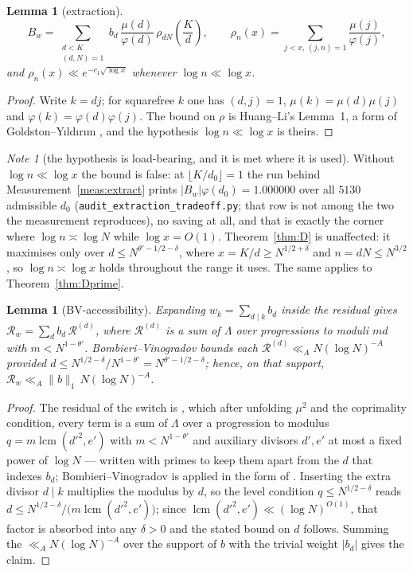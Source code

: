 \documentclass[11pt,a4paper]{article}
\theoremstyle{plain}
\newtheorem{lemma}[theorem]{Lemma}
\theoremstyle{definition}
\theoremstyle{remark}
\newtheorem{note}[theorem]{Note}
\DeclareMathOperator{\lcm}{lcm}
\begin{document}
\begin{lemma}[extraction]\label{lem:extract}
\[
  B_w=\sum_{\substack{d<K\\(d,N)=1}}b_d\,
   \frac{\mu(d)}{\varphi(d)}\,\rho_{dN}\!\left(\frac{K}{d}\right),
  \qquad
  \rho_{n}(x)=\!\!\sum_{j<x,\,(j,n)=1}\!\!\frac{\mu(j)}{\varphi(j)},
\]
and $\rho_n(x)\ll e^{-c_1\sqrt{\log x}}$ whenever $\log n\ll\log x$.
\end{lemma}

\begin{proof}
Write $k=dj$; for squarefree $k$ one has $(d,j)=1$,
$\mu(k)=\mu(d)\mu(j)$ and $\varphi(k)=\varphi(d)\varphi(j)$. The bound
on $\rho$ is Huang--Li's Lemma~1, a form of
Goldston--Y{\i}ld{\i}r{\i}m \cite{GY}, and the hypothesis
$\log n\ll\log x$ is theirs.
\end{proof}

\begin{note}[the hypothesis is load-bearing, and it is met where it is used]
Without $\log n\ll\log x$ the bound is false: at $\lfloor K/d_0\rfloor=1$
the run behind Measurement~\ref{meas:extract} prints
$|B_w|\varphi(d_0)=1.000000$ over all $5130$ admissible $d_0$
(\texttt{audit\_extraction\_tradeoff.py}; that row is not among the
two the measurement reproduces), no
saving at all, and that is exactly the corner where $\log n\asymp\log N$
while $\log x=O(1)$. Theorem~\ref{thm:D} is unaffected: it maximises
only over $d\le N^{\theta'-1/2-\delta}$, where $x=K/d\ge N^{1/2+\delta}$
and $n=dN\le N^{3/2}$, so $\log n\asymp\log x$ holds throughout the
range it uses. The same applies to Theorem~\ref{thm:Dprime}.
\end{note}

\begin{lemma}[BV-accessibility]\label{lem:bv}
Expanding $w_k=\sum_{d\mid k}b_d$ inside the residual gives
$\mathcal R_w=\sum_db_d\,\mathcal R^{(d)}$, where $\mathcal R^{(d)}$
is a sum of $\Lambda$ over progressions to moduli $md$ with
$m<N^{1-\theta'}$. Bombieri--Vinogradov bounds each
$\mathcal R^{(d)}\ll_AN(\log N)^{-A}$ provided
$d\le N^{1/2-\delta}/N^{1-\theta'}=N^{\theta'-1/2-\delta}$; hence, on
that support, $\mathcal R_w\ll_A\|b\|_1\,N(\log N)^{-A}$.
\end{lemma}

\begin{proof}
The residual of the switch is \cite[the residual identity]{P1}, which after unfolding
$\mu^2$ and the coprimality condition, every term is a sum of
$\Lambda$ over a progression to modulus $q=m\lcm(d'^2,e')$ with
$m<N^{1-\theta'}$ and auxiliary divisors $d',e'$ at most a fixed power
of $\log N$ --- written with primes to keep them apart from the $d$
that indexes $b_d$;
Bombieri--Vinogradov is applied in the form of \cite{MoV}.
Inserting the extra divisor $d\mid k$ multiplies the modulus by $d$,
so the level condition $q\le N^{1/2-\delta}$ reads
$d\le N^{1/2-\delta}/\bigl(m\lcm(d'^2,e')\bigr)$; since
$\lcm(d'^2,e')\ll(\log N)^{O(1)}$, that factor is absorbed into any
$\delta>0$ and the stated bound on $d$ follows. Summing the $\ll_AN(\log N)^{-A}$ over the support of
$b$ with the trivial weight $|b_d|$ gives the claim.
\end{proof}
\end{document}
